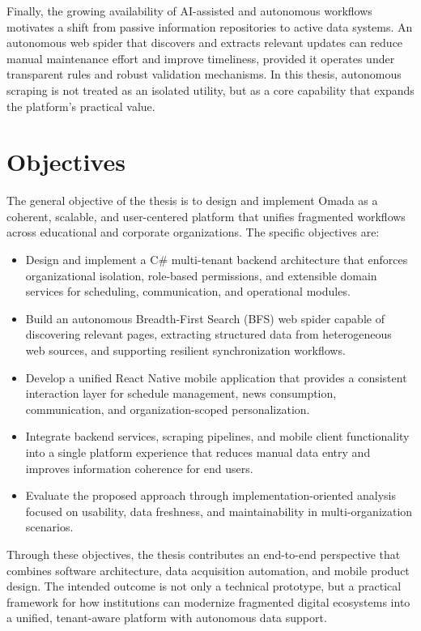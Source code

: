 Finally, the growing availability of AI-assisted and autonomous workflows motivates a shift from passive information repositories to active data systems. An autonomous web spider that discovers and extracts relevant updates can reduce manual maintenance effort and improve timeliness, provided it operates under transparent rules and robust validation mechanisms. In this thesis, autonomous scraping is not treated as an isolated utility, but as a core capability that expands the platform's practical value.

\section{Objectives}
The general objective of the thesis is to design and implement Omada as a coherent, scalable, and user-centered platform that unifies fragmented workflows across educational and corporate organizations. The specific objectives are:

\begin{itemize}
    \item Design and implement a C\# multi-tenant backend architecture that enforces organizational isolation, role-based permissions, and extensible domain services for scheduling, communication, and operational modules.
    \item Build an autonomous Breadth-First Search (BFS) web spider capable of discovering relevant pages, extracting structured data from heterogeneous web sources, and supporting resilient synchronization workflows.
    \item Develop a unified React Native mobile application that provides a consistent interaction layer for schedule management, news consumption, communication, and organization-scoped personalization.
    \item Integrate backend services, scraping pipelines, and mobile client functionality into a single platform experience that reduces manual data entry and improves information coherence for end users.
    \item Evaluate the proposed approach through implementation-oriented analysis focused on usability, data freshness, and maintainability in multi-organization scenarios.
\end{itemize}

Through these objectives, the thesis contributes an end-to-end perspective that combines software architecture, data acquisition automation, and mobile product design. The intended outcome is not only a technical prototype, but a practical framework for how institutions can modernize fragmented digital ecosystems into a unified, tenant-aware platform with autonomous data support.